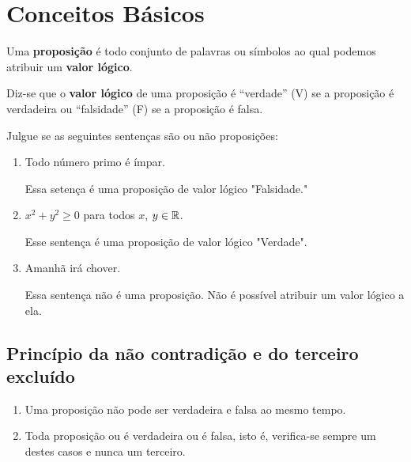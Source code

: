 \chapter{Conceitos Básicos} %
\label{cha:conceitos_basicos}

\begin{definicao}
    Uma \textbf{proposição} é todo conjunto de palavras ou símbolos ao qual podemos atribuir um \textbf{valor lógico}.
\end{definicao}

\begin{definicao}
    Diz-se que o \textbf{valor lógico} de uma proposição é ``verdade'' (V) se a proposição é verdadeira ou ``falsidade'' (F) se a proposição é falsa.
\end{definicao}

\begin{exemplos}
    Julgue se as seguintes sentenças são ou não proposições:
    \begin{enumerate}[label={\arabic*})]
        \item Todo número primo é ímpar.
        \begin{solucao}
            Essa setença é uma proposição de valor lógico "Falsidade."
        \end{solucao}

        \item $x^2 + y^2 \ge 0$ para todos $x$, $y \in \mathbb{R}$.
        \begin{solucao}
            Esse sentença é uma proposição de valor lógico "Verdade".
        \end{solucao}

        \item Amanhã irá chover.
        \begin{solucao}
            Essa sentença não é uma proposição. Não é possível atribuir um valor lógico a ela.
        \end{solucao}
    \end{enumerate}

\end{exemplos}

\section{Princípio da não contradição e do terceiro excluído} %
\label{sec:principio_da_nao_contradicao_e_do_3}
\begin{enumerate}[label={\roman*})]
    \item Uma proposição não pode ser verdadeira e falsa ao mesmo tempo.
    \item Toda proposição ou é verdadeira ou é falsa, isto é, verifica-se sempre um destes casos e nunca um terceiro.
\end{enumerate}

